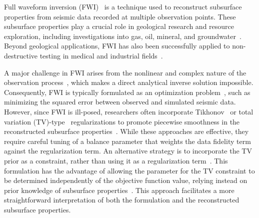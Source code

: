 %

Full waveform inversion (FWI)~\cite{FWI0,FWI1} is a technique used to reconstruct subsurface properties from seismic data recorded at multiple observation points.
These subsurface properties play a crucial role in geological research and resource exploration, including investigations into gas, oil, mineral, and groundwater~\cite{FWI1,FWIApplicationGroundwater0,FWIApplicationGroundwater1}.
Beyond geological applications, FWI has also been successfully applied to non-destructive testing in medical and industrial fields~\cite{FWIApplicationNonDestructiveTesting0,FWIApplicationNonDestructiveTesting1}.

A major challenge in FWI arises from the nonlinear and complex nature of the observation process~\cite{FWI1}, which makes a direct analytical inverse solution impossible.
Consequently, FWI is typically formulated as an optimization problem~\cite{FWI0,CustomFWI0,CustomFWI1,CustomFWI2,CustomFWI3,CustomFWI4,CustomFWI5}, such as minimizing the squared error between observed and simulated seismic data.
However, since FWI is ill-posed, researchers often incorporate Tikhonov~\cite{tikhonov} or total variation (TV)-type~\cite{TV,TGV} regularizations to promote piecewise smoothness in the reconstructed subsurface properties~\cite{FWI-with-tikhonov-regularization,FWI-with-TV-regularization,FWI-with-directional-TV-regularization,FWI-with-high-order-TV-regularization,FWI-with-TGV-regularization}.
While these approaches are effective, they require careful tuning of a balance parameter that weights the data fidelity term against the regularization term.
An alternative strategy is to incorporate the TV prior as a constraint, rather than using it as a regularization term~\cite{FWI-with-TV-constraint,FWI-with-TV-constraint2,FWI-with-TV-constraint3,FWI-with-TV-constraint4}.
This formulation has the advantage of allowing the parameter for the TV constraint to be determined independently of the objective function value, relying instead on prior knowledge of subsurface properties~\cite{constraint0,constraint1,constraint2,constraint3,constraint4,constraints-vs-penalties-in-FWI}.
This approach facilitates a more straightforward interpretation of both the formulation and the reconstructed subsurface properties.

